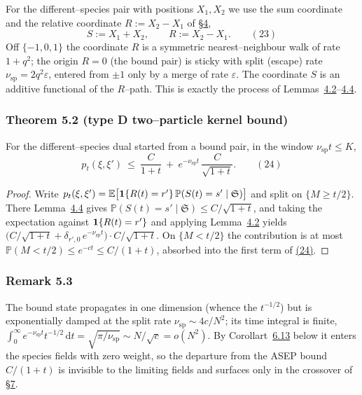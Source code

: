 \documentclass[11pt]{article}
\theoremstyle{plain}
\theoremstyle{definition}
\theoremstyle{remark}
\newcommand{\E}{\mathbb{E}}\newcommand{\PP}{\mathbb{P}}\newcommand{\dd}{\,\mathrm{d}}
\newcommand{\eps}{\varepsilon}\newcommand{\Exp}{\mathrm{Exp}}
\begin{document}
For the different--species pair with positions $X_1,X_2$ we use the sum coordinate and
the relative coordinate $R:=X_2-X_1$ of \S\hyperref[sec_lclt]{4},
\label{eq_SR}
\begin{equation}
  S:=X_1+X_2,\qquad R:=X_2-X_1.\qquad(23)
\end{equation}
Off $\{-1,0,1\}$ the coordinate $R$ is a symmetric nearest--neighbour walk of rate
$1+q^2$; the origin $R=0$ (the bound pair) is sticky with split (escape) rate
$\nu_{\mathrm{sp}}=2q^2\eps$, entered from $\pm1$ only by a merge of rate $\eps$. The
coordinate $S$ is an additive functional of the $R$--path. This is exactly the process
of Lemmas~\hyperref[lem_Rlclt]{4.2}--\hyperref[lem_Slclt]{4.4}.

\subsubsection{Theorem 5.2 (type D two--particle kernel bound)}\label{thm_kernel}

For the different--species dual started from a bound pair, in the window
$\nu_{\mathrm{sp}}t\le K$,
\label{eq_kernel}
\begin{equation}
  p_t(\xi,\xi')\ \le\ \frac{C}{1+t}\ +\ e^{-\nu_{\mathrm{sp}}t}\,\frac{C}{\sqrt{1+t}}.\qquad(24)
\end{equation}
\par
\begin{proof}
Write $p_t(\xi,\xi')=\E\big[\bone\{R(t)=r'\}\,\PP(S(t)=s'\mid\mathfrak S)\big]$ and
split on $\{M\ge t/2\}$. There Lemma~\hyperref[lem_Slclt]{4.4} gives
$\PP(S(t)=s'\mid\mathfrak S)\le C/\sqrt{1+t}$, and taking the expectation against
$\mathbf 1\{R(t)=r'\}$ and applying Lemma~\hyperref[lem_Rlclt]{4.2} yields
$\big(C/\sqrt{1+t}+\delta_{r',0}\,e^{-\nu_{\mathrm{sp}}t}\big)\cdot C/\sqrt{1+t}$. On
$\{M<t/2\}$ the contribution is at most $\PP(M<t/2)\le e^{-ct}\le C/(1+t)$, absorbed
into the first term of \hyperref[eq_kernel]{(24)}.
\end{proof}

\subsubsection{Remark 5.3}\label{rem_boundstate}

The bound state propagates in one dimension (whence the $t^{-1/2}$) but is
exponentially damped at the split rate $\nu_{\mathrm{sp}}\sim4c/N^2$; its time integral
is finite, $\int_0^\infty e^{-\nu_{\mathrm{sp}}t}t^{-1/2}\dd t=\sqrt{\pi/\nu_{\mathrm{sp}}}
\sim N/\sqrt c=o(N^2)$. By Corollart~\hyperref[prop_sym]{6.13} below it enters the species fields
with zero weight, so the departure from the ASEP bound $C/(1+t)$ is invisible to the
limiting fields and surfaces only in the crossover of \S\hyperref[sec_cross]{7}.
\par
\end{document}
